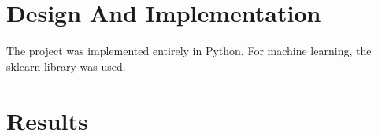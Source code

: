 \section{Design And Implementation}
The project was implemented entirely in Python. For machine learning, the sklearn library \cite{sklearn} was used.

\section{Results}
